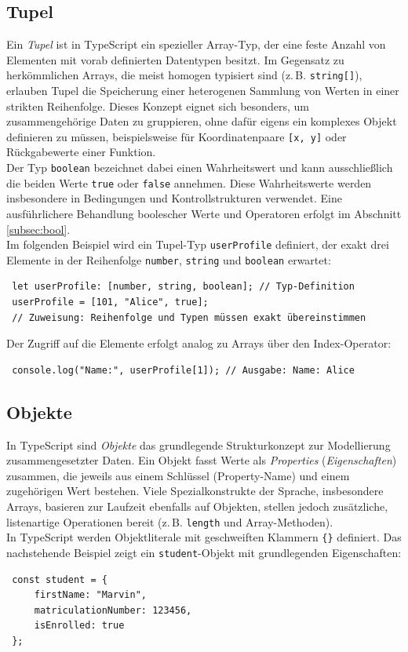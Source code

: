 \subsection{Tupel}
Ein \textit{Tupel} ist in TypeScript ein spezieller Array-Typ, der eine feste Anzahl von Elementen mit vorab definierten Datentypen besitzt. Im Gegensatz zu herkömmlichen Arrays, die meist homogen typisiert sind (z.\,B. \texttt{string[]}), erlauben Tupel die Speicherung einer heterogenen Sammlung von Werten in einer strikten Reihenfolge. Dieses Konzept eignet sich besonders, um zusammengehörige Daten zu gruppieren, ohne dafür eigens ein komplexes Objekt definieren zu müssen, beispielsweise für Koordinatenpaare \texttt{[x, y]} oder Rückgabewerte einer Funktion.\\
Der Typ \texttt{boolean} bezeichnet dabei einen Wahrheitswert und kann ausschließlich die beiden Werte \texttt{true} oder \texttt{false} annehmen. Diese Wahrheitswerte werden insbesondere in Bedingungen und Kontrollstrukturen verwendet. Eine ausführlichere Behandlung boolescher Werte und Operatoren erfolgt im Abschnitt \ref{subsec:bool}.\\
Im folgenden Beispiel wird ein Tupel-Typ \texttt{userProfile} definiert, der exakt drei Elemente in der Reihenfolge \texttt{number}, \texttt{string} und \texttt{boolean} erwartet:
\begin{verbatim}
 let userProfile: [number, string, boolean]; // Typ-Definition
 userProfile = [101, "Alice", true]; 
 // Zuweisung: Reihenfolge und Typen müssen exakt übereinstimmen
\end{verbatim}

Der Zugriff auf die Elemente erfolgt analog zu Arrays über den Index-Operator:
\begin{verbatim}
 console.log("Name:", userProfile[1]); // Ausgabe: Name: Alice
\end{verbatim}

\subsection{Objekte}
In TypeScript sind \textit{Objekte} das grundlegende Strukturkonzept zur Modellierung zusammengesetzter Daten. Ein Objekt fasst Werte als \textit{Properties} (\textit{Eigenschaften}) zusammen, die jeweils aus einem Schlüssel (Property-Name) und einem zugehörigen Wert bestehen. Viele Spezialkonstrukte der Sprache, insbesondere Arrays, basieren zur Laufzeit ebenfalls auf Objekten, stellen jedoch zusätzliche, listenartige Operationen bereit (z.\,B. \texttt{length} und Array-Methoden).\\
In TypeScript werden Objektliterale mit geschweiften Klammern \texttt{\{\}} definiert. Das nachstehende Beispiel zeigt ein \texttt{student}-Objekt mit grundlegenden Eigenschaften:
\begin{verbatim}
 const student = {
     firstName: "Marvin",
     matriculationNumber: 123456,
     isEnrolled: true
 };
\end{verbatim}

